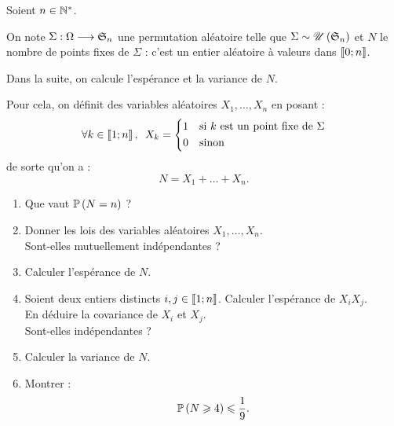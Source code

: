 \begin{corr}
\end{corr}

\begin{exo}[Exercice 12]
Soient \(n\in\Ns\).

On note \(\Sigma:\Omega\to\S{n}\) une permutation aléatoire telle que \(\Sigma\sim\loiuniforme{\S{n}}\) et \(N\) le nombre de points fixes de \(\Sigma\) : c'est un entier aléatoire à valeurs dans \(\interventierii{0}{n}\).

Dans la suite, on calcule l'espérance et la variance de \(N\).

Pour cela, on définit des variables aléatoires \(X_1,\dots,X_n\) en posant : \[\quantifs{\forall k\in\interventierii{1}{n}}X_k=\begin{dcases}
1 &\text{si }k\text{ est un point fixe de }\Sigma \\
0 &\text{sinon}
\end{dcases}\] de sorte qu'on a : \[N=X_1+\dots+X_n.\]

\begin{enumerate}
    \item Que vaut \(\proba{N=n}\) ? \\
    \item Donner les lois des variables aléatoires \(X_1,\dots,X_n\). \\ Sont-elles mutuellement indépendantes ? \\
    \item Calculer l'espérance de \(N\). \\
    \item Soient deux entiers distincts \(i,j\in\interventierii{1}{n}\). Calculer l'espérance de \(X_iX_j\). \\ En déduire la covariance de \(X_i\) et \(X_j\). \\ Sont-elles indépendantes ? \\
    \item Calculer la variance de \(N\). \\
    \item Montrer : \[\proba{N\geq4}\leq\dfrac{1}{9}.\]
\end{enumerate}
\end{exo}

\begin{corr}
\end{corr}
